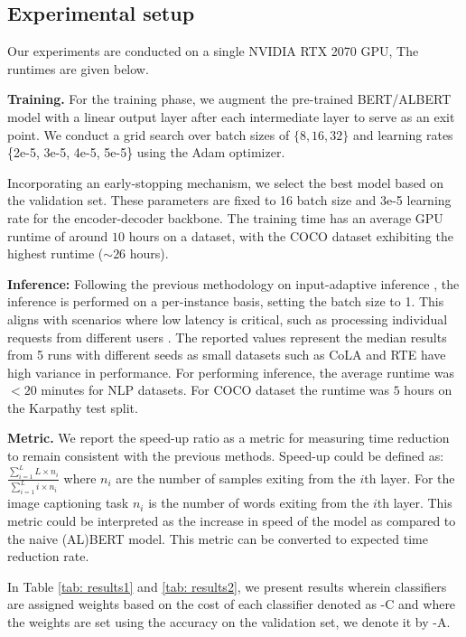 \subsection{Experimental setup}
Our experiments are conducted on a single NVIDIA RTX 2070 GPU, The runtimes are given below. 

\textbf{Training.} For the training phase, we augment the pre-trained BERT/ALBERT model with a linear output layer after each intermediate layer to serve as an exit point. We conduct a grid search over batch sizes of $\{8, 16, 32\}$ and learning rates \{2e-5, 3e-5, 4e-5, 5e-5\} using the Adam \citep{kingma2014adam} optimizer. 

Incorporating an early-stopping mechanism, we select the best model based on the validation set. These parameters are fixed to 16 batch size and 3e-5 learning rate for the encoder-decoder backbone. 
The training time has an average GPU runtime of around $10$ hours on a dataset, with the COCO dataset exhibiting the highest runtime ($\sim 26$ hours). 

\textbf{Inference:} Following the previous methodology on input-adaptive inference \citep{teerapittayanon2016branchynet, kaya2019shallow}, the inference is performed on a per-instance basis, setting the batch size to 1. This aligns with scenarios where low latency is critical, such as processing individual requests from different users \citep{schwartz2020right}. The reported values represent the median results from 5 runs with different seeds as small datasets such as CoLA and RTE have high variance in performance. For performing inference, the average runtime was $<20$ minutes for NLP datasets. For COCO dataset the runtime was $5$ hours on the Karpathy test split.



\textbf{Metric.} We report the speed-up ratio as a metric for measuring time reduction to remain consistent with the previous methods. Speed-up could be defined as:
$\frac{\sum_{i = 1}^L L\times n_i}{\sum_{i = 1}^L i\times n_i}$
where $n_i$ are the number of samples exiting from the $i$th layer. For the image captioning task $n_i$ is the number of words exiting from the $i$th layer. This metric could be interpreted as the increase in speed of the model as compared to the naive (AL)BERT model. This metric can be converted to expected time reduction rate.

In Table \ref{tab: results1} and \ref{tab: results2}, we present results wherein classifiers are assigned weights based on the cost of each classifier denoted as \algo{}-C and where the weights are set using the accuracy on the validation set, we denote it by \algo{}-A. 

